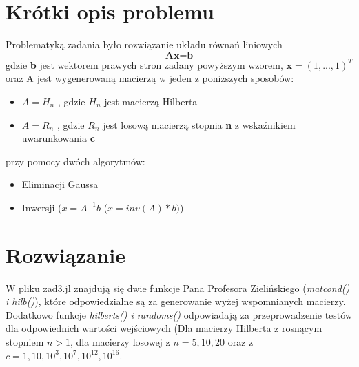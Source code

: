 \documentclass[a4paper,14pt]{report}
\begin{document}
  \section{Krótki opis problemu}
    Problematyką zadania było rozwiązanie układu równań liniowych
    \begin{equation}
      \textbf{Ax=b}
    \end{equation}
    gdzie \textbf{b} jest wektorem prawych stron zadany powyższym wzorem, $ \textbf{x}=(1,...,1)^{T} $ oraz A jest wygenerowaną macierzą w jeden z poniższych sposobów:
    \begin{itemize}
      \item \textbf{$A=H_{n}$} , gdzie \textbf{$H_{n}$} jest macierzą Hilberta
      \item \textbf{$A=R_{n}$} , gdzie \textbf{$R_{n}$} jest losową macierzą stopnia \textbf{n} z wskaźnikiem uwarunkowania \textbf{c}
    \end{itemize}
    przy pomocy dwóch algorytmów:
    \begin{itemize}
      \item Eliminacji Gaussa
      \item Inwersji ($x=A^{-1}b$ ($x=inv(A)*b)$)
    \end{itemize}

  \section{Rozwiązanie}
    W pliku zad3.jl znajdują się dwie funkcje Pana Profesora Zielińskiego (\textit{matcond() i hilb()}), które odpowiedzialne są za generowanie wyżej wspomnianych macierzy. \\
    Dodatkowo funkcje \textit{hilberts() i randoms()} odpowiadają za przeprowadzenie testów dla odpowiednich wartości wejściowych (Dla macierzy Hilberta z rosnącym stopniem $n>1$, dla macierzy losowej z $n=5,10,20$ oraz z $c=1,10,10^{3},10^{7},10^{12},10^{16}$.
\end{document}
